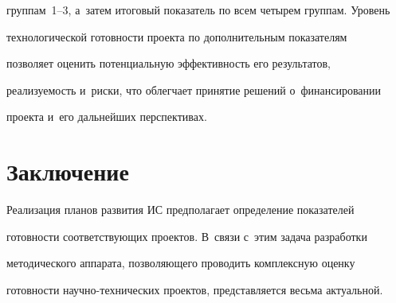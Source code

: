 группам~1--3, а~затем итоговый показатель по всем четырем группам. Уровень 

технологической готовности проекта по дополнительным показателям 

позволяет оценить потенциальную эффективность его результатов, 

реализуемость и~риски, что облегчает принятие решений о~финансировании 

проекта и~его дальнейших перспективах. 



\section{Заключение}



  Реализация планов развития ИС предполагает определение показателей 

готовности соответствующих проектов. В~связи с~этим задача разработки 

методического аппарата, позволяющего проводить комплексную оценку 

готовности на\-уч\-но-тех\-ни\-че\-ских проектов, представляется весьма актуальной.




